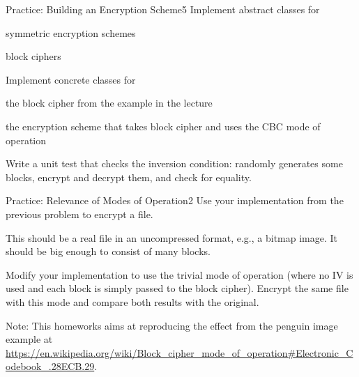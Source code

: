 \documentclass[a4paper]{article}
\begin{document}
\header

\begin{problem}{Practice: Building an Encryption Scheme}{5}
Implement abstract classes for
\begin{compactitem}
 \item symmetric encryption schemes
 \item block ciphers
\end{compactitem}

Implement concrete classes for
\begin{compactitem}
 \item the block cipher from the example in the lecture
 \item the encryption scheme that takes block cipher and uses the CBC mode of operation
\end{compactitem} 

Write a unit test that checks the inversion condition: randomly generates some blocks, encrypt and decrypt them, and check for equality.
\end{problem}

\begin{problem}{Practice: Relevance of Modes of Operation}{2}
Use your implementation from the previous problem to encrypt a file.

This should be a real file in an uncompressed format, e.g., a bitmap image.
It should be big enough to consist of many blocks.

Modify your implementation to use the trivial mode of operation (where no IV is used and each block is simply passed to the block cipher).
Encrypt the same file with this mode and compare both results with the original.

Note: This homeworks aims at reproducing the effect from the penguin image example at \url{https://en.wikipedia.org/wiki/Block_cipher_mode_of_operation#Electronic_Codebook_.28ECB.29}.
\end{problem}
\end{document}
